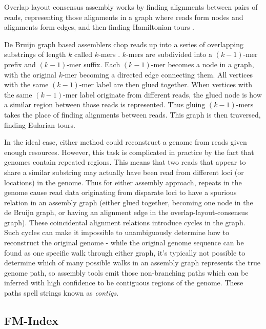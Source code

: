 Overlap layout consensus assembly works by finding alignments between pairs of reads, representing those alignments in a graph where reads form nodes and alignments form edges, and then finding Hamiltonian tours \cite{myers1995toward}.

De Bruijn graph based assemblers chop reads up into a series of overlapping substrings of length $k$ called $k$-mers \cite{pevzner2001eulerian}.
$k$-mers are subdivided into a $(k-1)$-mer prefix and $(k-1)$-mer suffix.
Each $(k-1)$-mer becomes a node in a graph, with the original $k$-mer becoming a directed edge connecting them.  
All vertices with the same $(k-1)$-mer label are then glued together. When vertices with the same $(k-1)$-mer label originate from different reads, the glued node is how a similar region between those reads is represented. Thus gluing $(k-1)$-mers takes the place of finding alignments between reads.  This graph is then traversed, finding Eularian tours.

In the ideal case, either method could reconstruct a genome from reads given enough resources.  However, this task is complicated in practice by the fact that genomes contain repeated regions. This means that two reads that appear to share a similar substring may actually have been read from different loci (or locations) in the genome.  Thus for either assembly approach, repeats in the genome cause read data originating from disparate loci to have a spurious relation in an assembly graph (either glued together, becoming one node in the de Bruijn graph, or having an alignment edge in the overlap-layout-consensus graph). These coincidental alignment relations introduce cycles in the graph.  Such cycles can make it impossible to unambiguously determine how to reconstruct the original genome - while the original genome sequence can be found as one specific walk through either graph, it's typically not possible to determine which of many possible walks in an assembly graph represents the true genome path, so assembly tools emit those non-branching paths which can be inferred with high confidence to be contiguous regions of the genome.
These paths spell strings known as \emph{contigs}.

\subsection{FM-Index}

